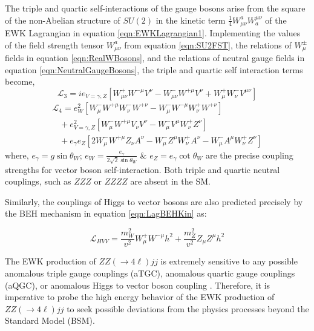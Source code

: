 The triple and quartic self-interactions of the gauge bosons arise from the square of the non-Abelian structure of $SU(2)$ in the kinetic term $ \frac{1}{4} W^{a}_{\mu\nu} W^{\mu\nu}_{a}$ of the EWK Lagrangian in equation \ref{eqn:EWKLagrangian1}. Implementing the values of the field strength tensor $W^{a}_{\mu\nu}$ from equation \ref{eqn:SU2FST}, the relations of $W_{\mu}^{\pm}$ fields in equation \ref{eqn:RealWBosons}, and the relations of neutral gauge fields in equation \ref{eqn:NeutralGaugeBosons}, the triple and quartic self interaction terms become, 
\begin{equation}
\mathcal{L}_{3} = ie_{V=\gamma,Z} [ W^{+}_{\mu\nu} W^{-\mu} V^{\nu} - W^{-}_{\mu\nu} W^{+\mu} V^{\nu} + W_{\mu}^{+}W_{\nu}^{-}V^{\mu\nu} ] 
\label{eqn:L_TGC}
\end{equation}
\begin{equation}
\begin{array}{l}
\mathcal{L}_{4} = e^{2}_{W} [ W^{-}_{\mu}W^{+\mu}W^{-}_{\nu}W^{+\nu} - W^{-}_{\mu}W^{-\mu}W^{+}_{\nu}W^{+\nu} ] \\
 \hspace{10pt} + e^2_{V=\gamma,Z} [ W^{-}_{\mu}W^{+\mu}V_{\nu}V^{\nu} - W^{-}_{\mu}V^{\mu}W^{+}_{\nu}Z^{\nu} ] \\
  \hspace{10pt} + e_{\gamma}e_{Z} [ 2W^{-}_{\mu} W^{+\mu} Z_{\nu}A^{\nu} - W_{\mu}^{-}Z^{\mu}W^{+}_{\nu}A^{\nu} - W_{\mu}^{-}A^{\mu}W^{+}_{\nu}Z^{\nu} ]
\end{array}
\label{eqn:L_QGC}
\end{equation}
where, $e_{\gamma} = g\sin\theta_{W}$; $e_{W} = \frac{e_{\gamma}}{2\sqrt{2}\sin\theta_{W}}$ $\&$ $e_{Z} = e_{\gamma}\cot\theta_{W}$ are the precise coupling strengths for vector boson self-interaction. Both triple and quartic neutral couplings, such as $ZZZ$ or $ZZZZ$ are absent in the SM. 

Similarly, the couplings of Higgs to vector bosons are also predicted precisely by the BEH mechanism in equation \ref{eqn:LagBEHKin} as:

\begin{equation}
\mathcal{L}_{HVV} = \frac{m_{W}^2}{v^2} W^{+}_{\mu}W^{-\mu}h^{2} + \frac{m_{Z}^{2}}{v^2} Z_{\mu}Z^{\mu}h^{2}
\label{eqn:HVVCoupling}
\end{equation}

The EWK production of $ZZ( \rightarrow 4\ell ) jj$ is extremely sensitive to any possible anomalous triple gauge couplings (aTGC), anomalous quartic gauge couplings (aQGC), or anomalous Higgs to vector boson coupling \cite{SensitivityNP} \cite{EboliModelaQGC} \cite{BSM_Simple2HDM}. Therefore, it is imperative to probe the high energy behavior of the EWK production of $ZZ( \rightarrow 4\ell ) jj$ to seek possible deviations from the physics processes beyond the Standard Model (BSM). 

